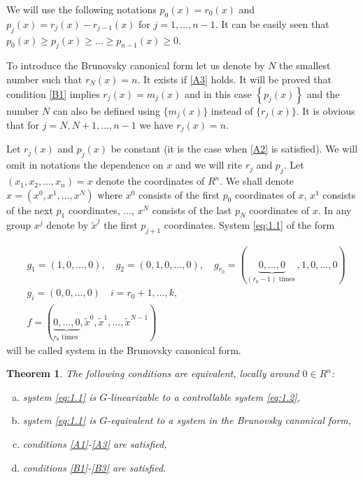 \documentclass[leqno]{article}
\theoremstyle{plain}
\newtheorem{theorem}{Theorem}
\numberwithin{equation}{section}
\begin{document}
We will use the following notations $p_{0}(x)=r_{0}(x)$ and $p_{j}(x)=r_{j}(x)-r_{j-1}(x)$ for $j = 1, \dotsc, n-1$. It can be easily seen that $p_{0}(x) \geqslant p_{j}(x) \geqslant \ldots \geqslant p_{n-1}(x) \geqslant 0$.

To introduce the Brunovsky canonical form let us denote by $N$ the smallest number such that $r_{N}(x)=n$. 
It exists if \eqref{A3} holds. 
It will be proved that condition \eqref{B1} implies $r_{j}(x)=m_{j}(x)$ and in this case $\left\{p_{j}(x)\right\}$ and the number $N$ can also be defined using $\{m_j(x)\}$ instead of $\{r_j(x)\}$.
It is obvious that for $j =N, N+1, \dotsc, n-1$ we have $r_j(x) = n$.

Let $r_j(x)$ and $p_j(x)$ be constant (it is the case when \eqref{A2} is satisfied).
We will omit in notations the dependence on $x$ and we will rite $r_j$ and $p_j$.
Let $\left(x_{1}, x_{2}, \ldots, x_{n}\right)=x$ denote the coordinates of $R^{n}$. 
We shall denote $x = \left(x^{0}, x^{1}, \ldots, x^{N}\right)$ where $x^0$ consists of the first $p_0$ coordinates of $x$, $x^{1}$ consists of the next $p_1$ coordinates, ..., $x^{N}$ consists of the last $p_{N}$ coordinates of $x$. 
In any group $x^j$ denote by $\tilde{x}^j$ the first $p_{j+1}$ coordinates. 
System \eqref{eq:1.1} of the form

\begin{equation} \label{eq:2.1}
	\begin{split}
		& g_{1}=(1,0, \ldots, 0), \quad 
		g_{2}=(0,1,0, \ldots, 0), \quad 
		g_{r_{0}}=(\underbrace{0, \ldots, 0}_{(r_{0}-1)\text { times }},1,0, \ldots, 0) \\
		& g_{i}=(0,0, \ldots, 0) \quad i=r_{0}+1, \ldots, k \text {, } \\
		& f=(\underbrace{0, \ldots, 0}_{r_{0} \text { times }}, \tilde{x}^{0}, \tilde{x}^{1}, \ldots, \tilde{x}^{N-1})
	\end{split}
\end{equation}
will be called system in the Brunovsky canonical form.

\begin{theorem}
	\label{thm:1}
	The following conditions are equivalent, locally around $0 \in R^{n}$:
	\begin{enumerate}[(a)]
		\item \label{a} system \eqref{eq:1.1} is $G$-linearizable to a controllable system \eqref{eq:1.2},
		\item \label{b} system \eqref{eq:1.1} is $G$-equivalent to a system in the Brunovsky canonical form,
		\item \label{c} conditions \eqref{A1}-\eqref{A3} are satisfied,
		\item \label{d} conditions \eqref{B1}-\eqref{B3} are satisfied.
	\end{enumerate}
\end{theorem}
\end{document}
